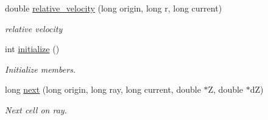 \begin{DoxyCompactItemize}
\mbox{\label{structCELLS_a4a290690f0721ae523a91954b129c898}} 
double \mbox{\hyperlink{structCELLS_a4a290690f0721ae523a91954b129c898}{relative\+\_\+velocity}} (long origin, long r, long current)
\begin{DoxyCompactList}\small\item\em relative velocity \end{DoxyCompactList}\item 
\mbox{\label{structCELLS_ab089fb695e506952925b2cb4861aecd0}} 
int \mbox{\hyperlink{structCELLS_ab089fb695e506952925b2cb4861aecd0}{initialize}} ()
\begin{DoxyCompactList}\small\item\em Initialize members. \end{DoxyCompactList}\item 
\mbox{\label{structCELLS_a44921a7e1fe4f959e66ef67982dd14be}} 
long \mbox{\hyperlink{structCELLS_a44921a7e1fe4f959e66ef67982dd14be}{next}} (long origin, long ray, long current, double $\ast$Z, double $\ast$dZ)
\begin{DoxyCompactList}\small\item\em Next cell on ray. \end{DoxyCompactList}\end{DoxyCompactItemize}
